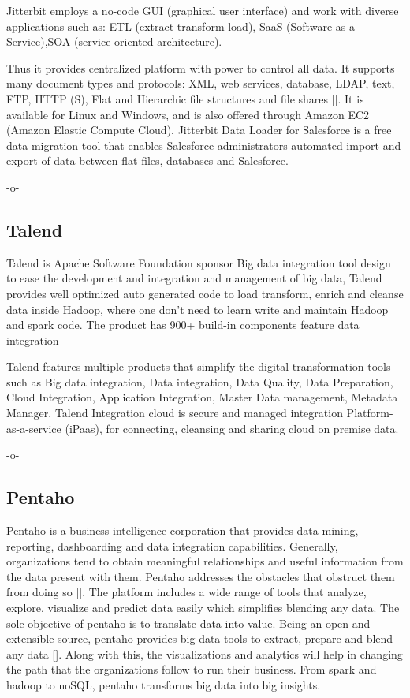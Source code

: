 Jitterbit employs a no-code GUI (graphical user interface) and work
with diverse applications such as: ETL (extract-transform-load), SaaS
(Software as a Service),SOA (service-oriented architecture).

Thus it provides centralized platform with power to control all
data. It supports many document types and protocols: XML, web
services, database, LDAP, text, FTP, HTTP (S), Flat and Hierarchic
file structures and file shares [\cite{tech-manual}]. It is available
for Linux and Windows, and is also offered through Amazon EC2 (Amazon
Elastic Compute Cloud). Jitterbit Data Loader for Salesforce is a free
data migration tool that enables Salesforce administrators automated
import and export of data between flat files, databases and
Salesforce.

    -o-

\subsection{Talend}

Talend is Apache Software Foundation sponsor Big data integration tool
design to ease the development and integration and management of big
data, Talend provides well optimized auto generated code to load
transform, enrich and cleanse data inside Hadoop, where one don't need
to learn write and maintain Hadoop and spark code.  The product has
900+ build-in components feature data integration
     
Talend features multiple products that simplify the digital
transformation tools such as Big data integration, Data integration,
Data Quality, Data Preparation, Cloud Integration, Application
Integration, Master Data management, Metadata Manager.  Talend
Integration cloud is secure and managed integration
Platform-as-a-service (iPaas), for connecting, cleansing and sharing
cloud on premise data.

    -o-

\subsection{Pentaho}

Pentaho is a business intelligence corporation that provides data
mining, reporting, dashboarding and data integration
capabilities. Generally, organizations tend to obtain meaningful
relationships and useful information from the data present with
them. Pentaho addresses the obstacles that obstruct them from doing so
[\cite{pent1}]. The platform includes a wide range of tools that
analyze, explore, visualize and predict data easily which simplifies
blending any data. The sole objective of pentaho is to translate data
into value. Being an open and extensible source, pentaho provides big
data tools to extract, prepare and blend any data
[\cite{pent2}]. Along with this, the visualizations and analytics will
help in changing the path that the organizations follow to run their
business. From spark and hadoop to noSQL, pentaho transforms big data
into big insights.

